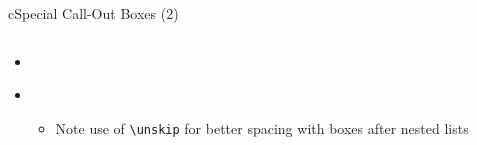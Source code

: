\begin{myslidefragile}{c}{Special Call-Out Boxes (2)}

\begin{columns}

\begin{column}{1\textwidth}

\begin{itemize}

\itembox
\begin{myremark}
\lipsum[1][1]
\end{myremark}

\item \lipsum[1][6]%

\itembox
\begin{myimportant}
\lipsum[1][1-2]
\end{myimportant}

\itembox
\begin{myfuture}
\lipsum[1][1]
\end{myfuture}

\item \lipsum[1][6]

\begin{itemize}

\item Note use of \lstinline{\unskip} for better spacing with boxes after nested lists

\end{itemize}

\unskip

\itembox
\begin{myquestion}
\lipsum[1][2-3]
\end{myquestion}

\end{itemize}

\end{column}

\end{columns}

\end{myslidefragile}

